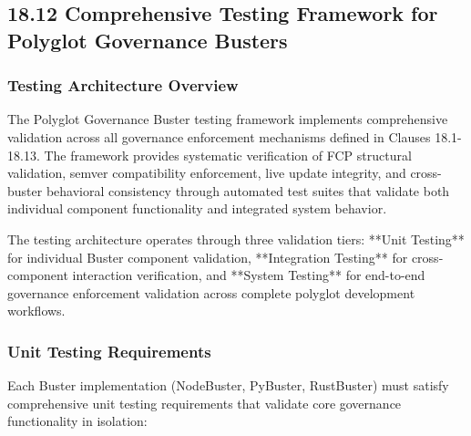 \subsection{18.12 Comprehensive Testing Framework for Polyglot Governance Busters}
\label{sec:buster-testing-framework}

\subsubsection{Testing Architecture Overview}

The Polyglot Governance Buster testing framework implements comprehensive validation across all governance enforcement mechanisms defined in Clauses 18.1-18.13. The framework provides systematic verification of FCP structural validation, semver compatibility enforcement, live update integrity, and cross-buster behavioral consistency through automated test suites that validate both individual component functionality and integrated system behavior.

The testing architecture operates through three validation tiers: **Unit Testing** for individual Buster component validation, **Integration Testing** for cross-component interaction verification, and **System Testing** for end-to-end governance enforcement validation across complete polyglot development workflows.

\subsubsection{Unit Testing Requirements}

Each Buster implementation (NodeBuster, PyBuster, RustBuster) must satisfy comprehensive unit testing requirements that validate core governance functionality in isolation:

